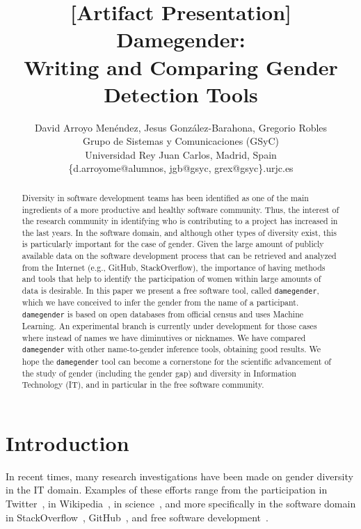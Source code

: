 \documentclass[a4paper]{article}
\title{[Artifact Presentation] Damegender: \\ Writing and Comparing Gender Detection Tools}
\author{
David Arroyo Menéndez, Jesus González-Barahona, Gregorio Robles \\ Grupo de Sistemas y Comunicaciones (GSyC) \\ Universidad Rey Juan Carlos, Madrid, Spain \\ \{d.arroyome@alumnos, jgb@gsyc, grex@gsyc\}.urjc.es
}
\begin{document}
\maketitle

\begin{abstract}
Diversity in software development teams has been identified as one of the main ingredients of a more productive and healthy software community.
Thus, the interest of the research community in identifying who is contributing to a project has increased in the last years.
In the software domain, and although other types of diversity exist, this is particularly important for the case of gender.
Given the large amount of publicly available data on the software development process that can be retrieved and analyzed from the Internet (e.g., GitHub, StackOverflow), the importance of having methods and tools that help to identify the participation of women within large amounts of data is desirable.
In this paper we present a free software tool, called \texttt{damegender}, which we have conceived to infer the gender from the name of a participant.
\texttt{damegender} is based on open databases from official census and uses Machine Learning.
An experimental branch is currently under development for those cases where instead of names we have diminutives or nicknames.
We have compared \texttt{damegender} with other name-to-gender inference tools, obtaining good results.
We hope the \texttt{damegender} tool can become a cornerstone for the scientific advancement of the study of gender (including the gender gap) and diversity in Information Technology (IT), and in particular in the free software community.
\end{abstract}


\section{Introduction}

In recent times, many research investigations have been made on gender diversity in the IT domain.
Examples of these efforts range from the participation in Twitter~\cite{burger2011discriminating,mislove2011understanding},
in Wikipedia~\cite{antin2011gender,hill2013wikipedia}, in science~\cite{holman2018gender,dollar1999gender}, and more specifically in the software domain in StackOverflow~\cite{vasilescu2012gender,vasilescu2015gender}, GitHub~\cite{vasilescu2015gender}, and free software development~\cite{robles2014floss,izquierdo2018openstack,lee2019floss,catolino2019gender}.
\end{document}
